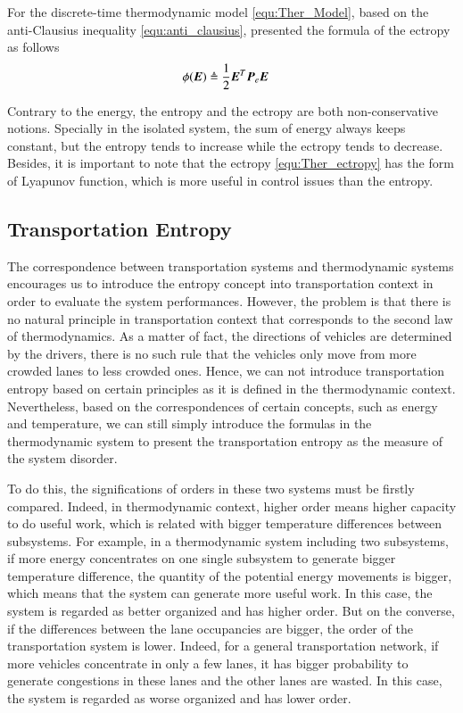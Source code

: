 \documentclass[preprint,authoryear,12pt]{elsarticle}
\renewcommand{\vec}[1]{\mbox{\boldmath$#1$}}
\newcommand{\mat}[1]{\mbox{\boldmath$#1$}}
\begin{document}
For the discrete-time thermodynamic model \eqref{equ:Ther_Model},
based on the anti-Clausius inequality \eqref{equ:anti_clausius},
\citet{haddad_thermodynamic_2005} presented the formula of the
ectropy as follows
\begin{align}
\phi(\vec{E})&\triangleq\frac{1}{2}\vec{E}^T \mat{P}_e \vec{E}
\label{equ:Ther_ectropy}
\end{align}

Contrary to the energy, the entropy and the ectropy are both
non-conservative notions. Specially in the isolated system, the sum
of energy always keeps constant, but the entropy tends to increase
while the ectropy tends to decrease. Besides, it is important to note
that the ectropy \eqref{equ:Ther_ectropy} has the form of Lyapunov
function, which is more useful in control issues than the entropy.

\subsection{Transportation Entropy}
The correspondence between transportation systems and thermodynamic
systems encourages us to introduce the entropy concept into
transportation context in order to evaluate the system performances.
However, the problem is that there is no natural principle in
transportation context that corresponds to the second law of
thermodynamics. As a matter of fact, the directions of vehicles are
determined by the drivers, there is no such rule that the vehicles
only move from more crowded lanes to less crowded ones. Hence, we can
not introduce transportation entropy based on certain principles as
it is defined in the thermodynamic context. Nevertheless, based on
the correspondences of certain concepts, such as energy and
temperature, we can still simply introduce the formulas in the
thermodynamic system to present the transportation entropy as the
measure of the system disorder.

To do this, the significations of orders in these two systems must be
firstly compared. Indeed, in thermodynamic context, higher order
means higher capacity to do useful work, which is related with bigger
temperature differences between subsystems. For example, in a
thermodynamic system including two subsystems, if more energy
concentrates on one single subsystem to generate bigger temperature
difference, the quantity of the potential energy movements is bigger,
which means that the system can generate more useful work. In this
case, the system is regarded as better organized and has higher
order. But on the converse, if the differences between the lane
occupancies are bigger, the order of the transportation system is
lower. Indeed, for a general transportation network, if more vehicles
concentrate in only a few lanes, it has bigger probability to
generate congestions in these lanes and the other lanes are wasted.
In this case, the system is regarded as worse organized and has lower
order.
\end{document}
